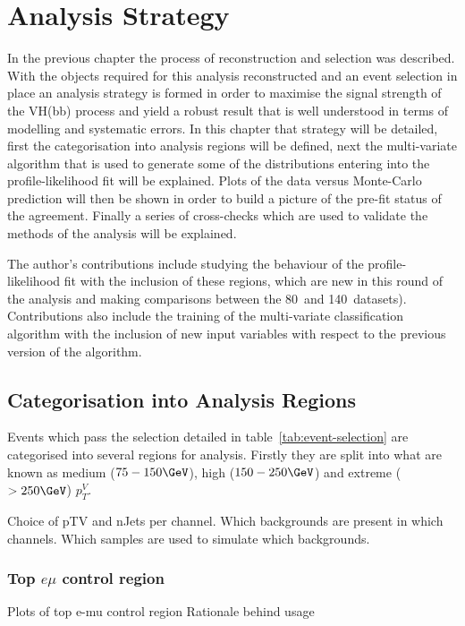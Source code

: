 \chapter{Analysis Strategy}%
\label{ch:strategy}
In the previous chapter the process of reconstruction and selection was
described. With the objects required for this analysis reconstructed and an
event selection in place an analysis strategy is formed in order to maximise the
signal strength of the VH(bb) process and yield a robust result that is well
understood in terms of modelling and systematic errors. In this chapter that
strategy will be detailed, first the categorisation into analysis regions will
be defined, next the multi-variate algorithm that is used to generate some of
the distributions entering into the profile-likelihood fit will be explained.
Plots of the data versus Monte-Carlo prediction will then be shown in order to
build a picture of the pre-fit status of the agreement. Finally a series of
cross-checks which are used to validate the methods of the analysis will be
explained.

The author's contributions include studying the behaviour of the
profile-likelihood fit with the inclusion of these regions, which are new in
this round of the analysis and making comparisons between the 80~\invfb and
140~\invfb datasets). Contributions also include the training of the
multi-variate classification algorithm with the inclusion of new input variables
with respect to the previous version of the algorithm.

\section{Categorisation into Analysis Regions}
\label{sec:ana-regions}

Events which pass the selection detailed in table~\ref{tab:event-selection} are
categorised into several regions for analysis. Firstly they are split into what
are known as medium ($75 - 150 \GeV$), high ($150 - 250 \GeV$) and extreme ($ >
250 \GeV$) $p_T^{V}$.


Choice of pTV and nJets per channel.
Which backgrounds are present in which channels.
Which samples are used to simulate which backgrounds.



\subsection{Top \texorpdfstring{$e \mu$}{e mu} control region}%
\label{sec:topemucr}
Plots of top e-mu control region
Rationale behind usage


